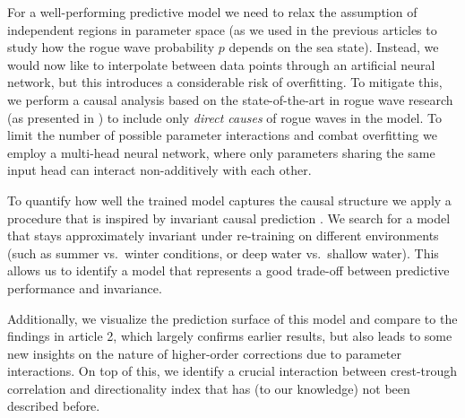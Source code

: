 For a well-performing predictive model we need to relax the assumption of independent regions in parameter space (as we used in the previous articles to study how the rogue wave probability $p$ depends on the sea state). Instead, we would now like to interpolate between data points through an artificial neural network, but this introduces a considerable risk of overfitting. To mitigate this, we perform a causal analysis based on the state-of-the-art in rogue wave research (as presented in ) to include only \emph{direct causes} of rogue waves in the model. To limit the number of possible parameter interactions and combat overfitting we employ a multi-head neural network, where only parameters sharing the same input head can interact non-additively with each other.

To quantify how well the trained model captures the causal structure we apply a procedure that is inspired by invariant causal prediction \citep[ICP;][]{peters_causal_2016,peters_elements_2017}. We search for a model that stays approximately invariant under re-training on different environments (such as summer vs.\ winter conditions, or deep water vs.\ shallow water). This allows us to identify a model that represents a good trade-off between predictive performance and invariance.

Additionally, we visualize the prediction surface of this model and compare to the findings in article 2, which largely confirms earlier results, but also leads to some new insights on the nature of higher-order corrections due to parameter interactions. On top of this, we identify a crucial interaction between crest-trough correlation and directionality index that has (to our knowledge) not been described before.

